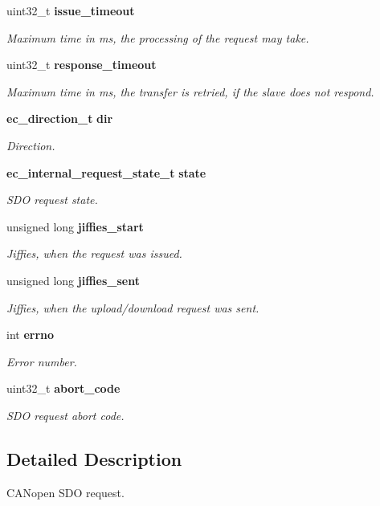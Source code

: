 \begin{DoxyCompactItemize}
uint32\-\_\-t {\bf issue\-\_\-timeout}
\begin{DoxyCompactList}\small\item\em \-Maximum time in ms, the processing of the request may take. \end{DoxyCompactList}\item 
uint32\-\_\-t {\bf response\-\_\-timeout}
\begin{DoxyCompactList}\small\item\em \-Maximum time in ms, the transfer is retried, if the slave does not respond. \end{DoxyCompactList}\item 
{\bf ec\-\_\-direction\-\_\-t} {\bf dir}
\begin{DoxyCompactList}\small\item\em \-Direction. \end{DoxyCompactList}\item 
{\bf ec\-\_\-internal\-\_\-request\-\_\-state\-\_\-t} {\bf state}
\begin{DoxyCompactList}\small\item\em \-S\-D\-O request state. \end{DoxyCompactList}\item 
unsigned long {\bf jiffies\-\_\-start}
\begin{DoxyCompactList}\small\item\em \-Jiffies, when the request was issued. \end{DoxyCompactList}\item 
unsigned long {\bf jiffies\-\_\-sent}
\begin{DoxyCompactList}\small\item\em \-Jiffies, when the upload/download request was sent. \end{DoxyCompactList}\item 
int {\bf errno}
\begin{DoxyCompactList}\small\item\em \-Error number. \end{DoxyCompactList}\item 
uint32\-\_\-t {\bf abort\-\_\-code}
\begin{DoxyCompactList}\small\item\em \-S\-D\-O request abort code. \end{DoxyCompactList}\end{DoxyCompactItemize}


\subsection{\-Detailed \-Description}
\-C\-A\-Nopen \-S\-D\-O request. 

